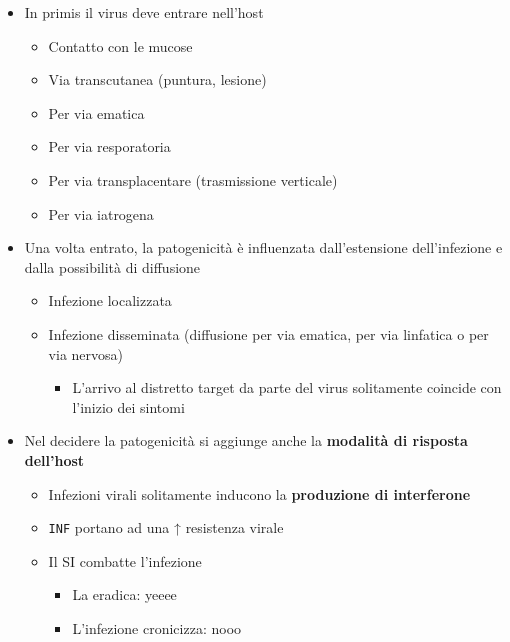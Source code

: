 \documentclass[italian,]{article}
\providecommand{\tightlist}{%
  \setlength{\itemsep}{0pt}\setlength{\parskip}{0pt}}
\begin{document}
\begin{itemize}
\tightlist
\item
  In primis il virus deve entrare nell'host

  \begin{itemize}
  \tightlist
  \item
    Contatto con le mucose
  \item
    Via transcutanea (puntura, lesione)
  \item
    Per via ematica
  \item
    Per via resporatoria
  \item
    Per via transplacentare (trasmissione verticale)
  \item
    Per via iatrogena
  \end{itemize}
\item
  Una volta entrato, la patogenicità è influenzata dall'estensione
  dell'infezione e dalla possibilità di diffusione

  \begin{itemize}
  \tightlist
  \item
    Infezione localizzata
  \item
    Infezione disseminata (diffusione per via ematica, per via linfatica
    o per via nervosa)

    \begin{itemize}
    \tightlist
    \item
      L'arrivo al distretto target da parte del virus solitamente
      coincide con l'inizio dei sintomi
    \end{itemize}
  \end{itemize}
\item
  Nel decidere la patogenicità si aggiunge anche la \textbf{modalità di
  risposta dell'host}

  \begin{itemize}
  \tightlist
  \item
    Infezioni virali solitamente inducono la \textbf{produzione di
    interferone}
  \item
    \texttt{INF} portano ad una ↑ resistenza virale
  \item
    Il SI combatte l'infezione

    \begin{itemize}
    \tightlist
    \item
      La eradica: yeeee
    \item
      L'infezione cronicizza: nooo


\end{itemize}
\end{itemize}
\end{itemize}
\end{document}
